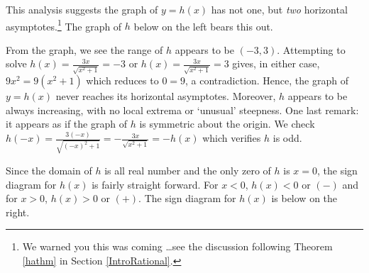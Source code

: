 \documentclass{ximera}
\begin{document}
\begin{example}
\begin{enumerate}
  This analysis suggests the graph of $y=h(x)$ has not one, but \textit{two} horizontal asymptotes.\footnote{We warned you this was coming \ldots see the discussion following Theorem \ref{hathm} in Section \ref{IntroRational}.} The graph of $h$ below on the left bears this out.

From the graph, we see the range of $h$ appears to be $(-3,3)$.  Attempting to solve $h(x) = \frac{3x}{\sqrt{x^2 + 1}} = -3$ or  $h(x) = \frac{3x}{\sqrt{x^2 + 1}} = 3$ gives, in either case, $9x^2 = 9(x^2+1)$ which reduces to $0 = 9$, a contradiction.  Hence, the graph of $y = h(x)$ never reaches its horizontal asymptotes. Moreover, $h$ appears to be always increasing, with no local extrema or `unusual' steepness.  One last remark:  it appears as if the graph of $h$ is symmetric about the origin.  We check $h(-x) = \frac{3(-x)}{\sqrt{(-x)^2+1}} = - \frac{3x}{\sqrt{x^2 + 1}} = -h(x)$ which verifies $h$ is odd.

\smallskip

Since the domain of $h$ is all real number and the only zero of $h$ is $x=0$, the sign diagram for $h(x)$ is fairly straight forward.  For $x<0$, $h(x)<0$ or $(-)$ and for $x>0$, $h(x) >0$ or $(+)$.  The sign diagram for $h(x)$ is below on the right.

\begin{center}

% 

\end{center} 

\begin{center}
\end{center}


\end{enumerate}
\end{example}
\end{document}
